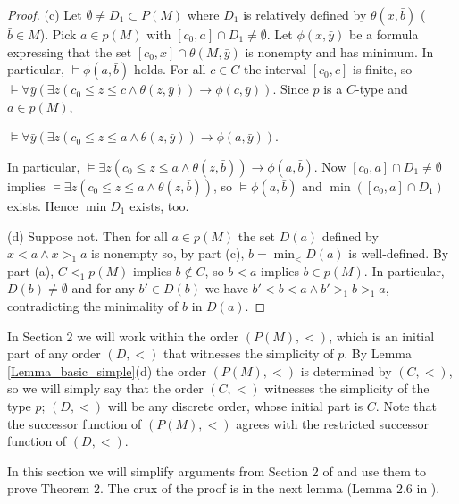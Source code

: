 \documentclass[10pt,a4paper]{amsart}
\theoremstyle{definition}
\begin{document}
\begin{proof}
\smallskip
(c) Let $\emptyset\neq D_1\subset P(M)$  where $D_1$ is relatively defined by $\theta(x,\bar b)$ ($\bar b\in M$). Pick $a\in p(M)$ with $[c_0,a]\cap D_1\neq\emptyset$.  Let $\phi(x,\bar y)$ be a formula expressing that the set
$[c_0,x]\cap\theta(M,\bar y)$ is nonempty and has minimum. 
In particular, $\models\phi(a,\bar b)$ holds. For all $c\in C$ the interval $[c_0,c]$ is finite, so $\models \forall \bar y \left(\exists z(c_0\leq z\leq c\land \theta(z,\bar y))\rightarrow \phi(c,\bar y)\right)$. Since $p$ is a $C$-type and $a\in p(M)$, 
\begin{center} 
$\models \forall \bar y \left(\exists z(c_0\leq z\leq a\land \theta(z,\bar y))\rightarrow \phi(a,\bar y)\right)$.  
\end{center}
In particular,   $\models  \exists z(c_0\leq z\leq a\land \theta(z,\bar b))\rightarrow \phi(a,\bar b)$.  Now  $[c_0,a]\cap D_1\neq \emptyset$ implies $\models  \exists z(c_0\leq z\leq a\land \theta(z,\bar b))$, so $\models\phi(a,\bar b)$ and $\min ([c_0,a]\cap D_1)$ exists. Hence $\min D_1$ exists, too.

\smallskip
(d) Suppose not. Then for all $a\in p(M)$ the set $D(a)$ defined by $x<a\land x>_1 a$ is nonempty so, by part (c), $b=\min_{<} D(a)$ is well-defined. By part (a), $C<_1p(M)$ implies $b\notin C$, so  $b<a$ implies $b\in p(M)$. In particular, $D(b)\neq\emptyset$ and for any $b'\in D(b)$ we have $b'<b<a\land b'>_1b>_1 a$, contradicting the minimality of $b$ in $D(a)$. 
\end{proof}

In Section 2 we will work  within the order $(P(M),<)$, which is an initial part of any  order $(D,<)$ that witnesses the simplicity of $p$. By Lemma \ref{Lemma_basic_simple}(d) the order $(P(M),<)$ is determined by   $(C,<)$, so we will simply say that the order $(C,<)$ witnesses the simplicity of the type $p$; $(D,<)$ will be any discrete order, whose initial part is $C$. Note that the  successor function  of $(P(M),<)$ agrees  with the restricted  successor function of $(D,<)$. 

In this section we will simplify arguments from Section 2 of \cite{DI} and use them to prove Theorem 2. The crux of the proof is in the next lemma (Lemma 2.6 in \cite{DI}). 
\end{document}

